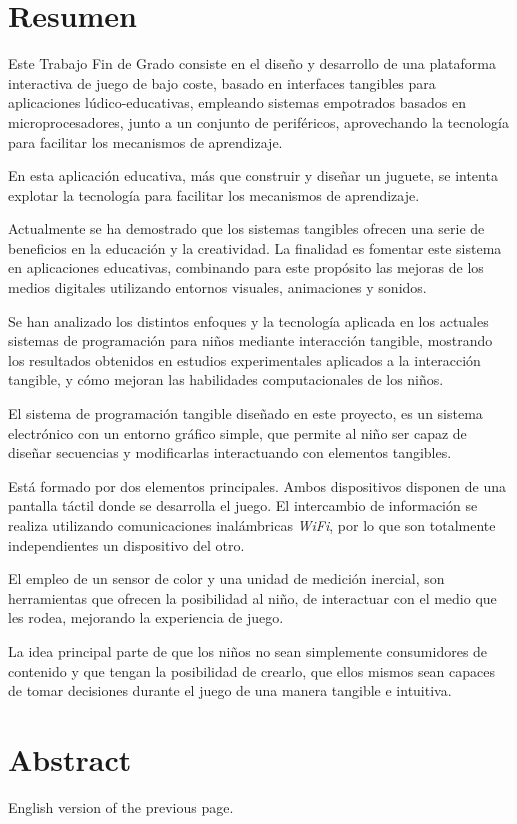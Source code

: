 \chapter{Resumen}
Este Trabajo Fin de Grado consiste en el diseño y desarrollo de una plataforma interactiva de juego de bajo coste, basado en interfaces tangibles para aplicaciones lúdico-educativas, empleando sistemas empotrados basados en microprocesadores, junto a un conjunto de periféricos, aprovechando la tecnología para facilitar los mecanismos 
de aprendizaje. 

En esta aplicación educativa, más que construir y diseñar un juguete, se intenta explotar la tecnología para facilitar los mecanismos de aprendizaje.

Actualmente se ha demostrado que los sistemas tangibles ofrecen una serie de beneficios en la educación y la creatividad. La finalidad es fomentar este sistema en aplicaciones educativas, combinando para este propósito las mejoras de los medios digitales utilizando entornos visuales, animaciones y sonidos.

Se han analizado los distintos enfoques y la tecnología aplicada en los actuales sistemas de programación para niños mediante interacción tangible, mostrando los resultados obtenidos en estudios experimentales aplicados a la interacción
tangible, y cómo mejoran las habilidades computacionales de los niños.

El sistema de programación tangible diseñado en este proyecto, es un sistema electrónico con un entorno gráfico simple, que permite al niño ser capaz de diseñar secuencias y modificarlas interactuando con elementos tangibles.

Está formado por dos elementos principales. Ambos dispositivos
disponen de una pantalla táctil donde se desarrolla el juego. El intercambio de información se realiza utilizando comunicaciones inalámbricas \emph{WiFi}, por lo que son totalmente
independientes un dispositivo del otro.

El empleo de un sensor de color y una unidad de medición inercial, son herramientas que ofrecen la posibilidad al niño, de interactuar con el medio que les rodea, mejorando la experiencia de juego.

La idea principal parte de que los niños no sean simplemente consumidores de contenido y que tengan la posibilidad de crearlo, que ellos mismos sean capaces de tomar decisiones durante el juego de una manera tangible e intuitiva.


\chapter{Abstract}

English version of the previous page.

